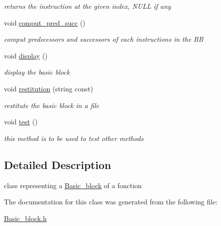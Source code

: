 \begin{DoxyCompactItemize}
\begin{DoxyCompactList}\small\item\em returns the instruction at the given index, NULL if any \item\end{DoxyCompactList}\item 
\hypertarget{classBasic__block_a55083b1af130185ccaf4febb9b33d680}{
void \hyperlink{classBasic__block_a55083b1af130185ccaf4febb9b33d680}{comput\_\-pred\_\-succ} ()}
\label{classBasic__block_a55083b1af130185ccaf4febb9b33d680}

\begin{DoxyCompactList}\small\item\em comput predecessors and successors of each instructions in the BB \item\end{DoxyCompactList}\item 
\hypertarget{classBasic__block_aad79779b098ba4ccd1549a8dbbd80d7d}{
void \hyperlink{classBasic__block_aad79779b098ba4ccd1549a8dbbd80d7d}{display} ()}
\label{classBasic__block_aad79779b098ba4ccd1549a8dbbd80d7d}

\begin{DoxyCompactList}\small\item\em display the basic block \item\end{DoxyCompactList}\item 
\hypertarget{classBasic__block_af74c4eeeecfb7a3f3fddbeb2994523a4}{
void \hyperlink{classBasic__block_af74c4eeeecfb7a3f3fddbeb2994523a4}{restitution} (string const)}
\label{classBasic__block_af74c4eeeecfb7a3f3fddbeb2994523a4}

\begin{DoxyCompactList}\small\item\em restitute the basic block in a file \item\end{DoxyCompactList}\item 
\hypertarget{classBasic__block_a0f26ff105216c62082905097b5dcebd3}{
void \hyperlink{classBasic__block_a0f26ff105216c62082905097b5dcebd3}{test} ()}
\label{classBasic__block_a0f26ff105216c62082905097b5dcebd3}

\begin{DoxyCompactList}\small\item\em this method is to be used to test other methods \item\end{DoxyCompactList}\end{DoxyCompactItemize}


\subsection{Detailed Description}
class representing a \hyperlink{classBasic__block}{Basic\_\-block} of a fonction 

The documentation for this class was generated from the following file:\begin{DoxyCompactItemize}
\item 
\hyperlink{Basic__block_8h}{Basic\_\-block.h}\end{DoxyCompactItemize}
